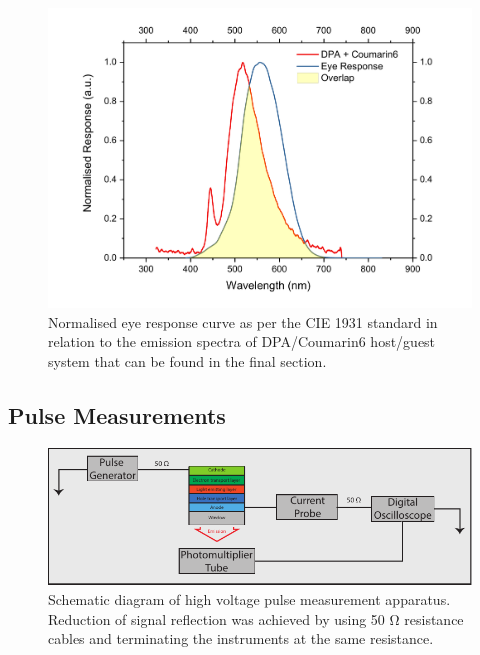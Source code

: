 \documentclass[
  letterpaper,
  DIV=11,
  numbers=noendperiod,
  oneside]{scrreprt}
\begin{document}
\begin{figure}

{\centering \includegraphics{./images/EyeResponse.pdf}

}

\caption{\label{fig-eye}Normalised eye response curve as per the CIE
1931 standard in relation to the emission spectra of DPA/Coumarin6
host/guest system that can be found in the final section.}

\end{figure}

\hypertarget{pulse-measurements-1}{%
\subsection{Pulse Measurements}\label{pulse-measurements-1}}

\begin{figure}

{\centering \includegraphics{./images/Pulse.pdf}

}

\caption{\label{fig-pulse}Schematic diagram of high voltage pulse
measurement apparatus. Reduction of signal reflection was achieved by
using 50 {Ω} resistance cables and terminating the instruments at the
same resistance.}

\end{figure}
\end{document}
